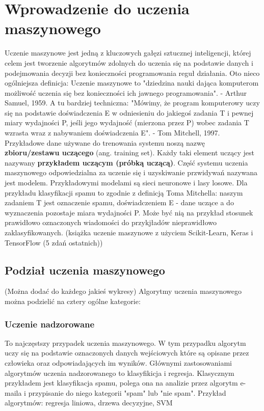 \documentclass[a4paper, 10pt]{article}
\begin{document}
    \section{Wprowadzenie do uczenia maszynowego}
    \indent Uczenie maszynowe jest jedną z kluczowych gałęzi sztucznej inteligencji, której celem jest tworzenie algorytmów zdolnych
    do uczenia się na podstawie danych i podejmowania decyzji bez konieczności programowania reguł działania. 
    Oto nieco ogólniejsza definicja: Uczenie maszynowe to "dziedzina nauki dająca komputerom możliwość uczenia się
    bez konieczności ich jawnego programowania". - Arthur Samuel, 1959. A tu bardziej techniczna:
    "Mówimy, że program komputerowy uczy się na podstawie doświadczenia E w odniesieniu do jakiegoś zadania T
    i pewnej miary wydajności P, jeśli jego wydajność (mierzona przez P) wobec zadania T wzrasta wraz z nabywaniem
    doświadczenia E". - Tom Mitchell, 1997. Przykładowe dane używane do trenowania systemu noszą nazwę
    \textbf{zbioru/zestawu uczącego} (ang. training set). Każdy taki element uczący jest nazywany 
    \textbf{przykładem uczącym (próbką uczącą)}. Część systemu uczenia maszynowego odpowiedzialna za uczenie się i uzyskiwanie 
    przwidywań nazywana jest modelem. Przykładowymi modelami są sieci neuronowe i lasy losowe. Dla przykładu klasyfikacji spamu to zgodnie z definicją Toma Mitchella: naszym
    zadaniem T jest oznaczenie spamu, doświadczeniem E - dane uczące a do wyznaczenia pozostaje miara wydajności P.
    Może być nią na przykład stosunek prawidłowo oznaczonych wiadomości do przykjładów nieprawidłowo zaklasyfikowanych.
    (książka uczenie maszynowe z użyciem Scikit-Learn, Keras i TensorFlow (5 zdań ostatnich))
    
    \subsection{Podział uczenia maszynowego} (Można dodać do każdego jakieś wykresy)
    Algorytmy uczenia maszynowego można podzielić na cztery ogólne kategorie:
    
    \subsubsection{Uczenie nadzorowane}
    To najczęstszy przypadek uczenia maszynowego. W tym przypadku algorytm uczy się na podstawie
    oznaczonych danych wejściowych które są opisane przez człowieka oraz odpowiadających im wyników.
    Głównymi zastosowaniami algorytmów uczenia nadzorowanego to klasyfikicja i regresja. Klasycznym przykładem
    jest klasyfikacja spamu, polega ona na analizie przez algorytm e-maila i przypisanie do niego kategorii "spam" 
    lub "nie spam". Przykład algorytmów: regresja liniowa, drzewa decyzyjne, SVM
\end{document}

